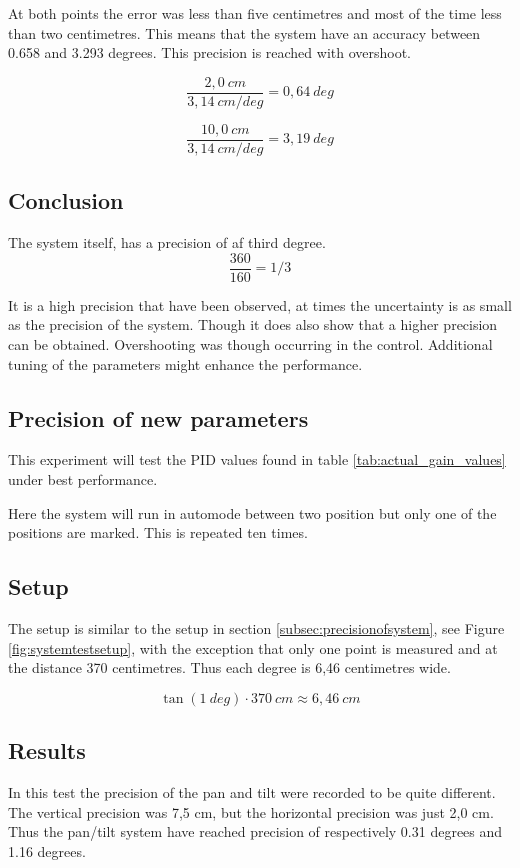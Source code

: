 At both points the error was less than five centimetres and most of the time
less than two centimetres. This means that the system have an accuracy between 0.658 and
3.293 degrees. This precision is reached with overshoot.

\[ \frac{2,0 \ cm}{3,14\ cm/deg} = 0,64 \ deg \]

\[ \frac{10,0 \ cm}{3,14 \ cm/deg} = 3,19 \ deg \]

\subsection*{Conclusion}

The system itself, has a precision of af third degree.
\[ \frac{360}{160} = 1/3 \]

It is a high precision that have been observed, at times the uncertainty is as
small as the precision of the system. Though it does also show that a higher
precision can be obtained. Overshooting was though occurring in the control.
Additional tuning of the parameters might enhance the performance.

\subsection{Precision of new parameters}\label{sec:precisionofsystem2}

This experiment will test the PID values found in table \ref{tab:actual_gain_values}
under best performance.

Here the system will run in automode between two position but only one of the
positions are marked. This is repeated ten times.

\subsection*{Setup}

The setup is similar to the setup in section \ref{subsec:precisionofsystem}, see
Figure \ref{fig:systemtestsetup}, with the exception that only one point is measured and at
the distance 370 centimetres. Thus each degree is 6,46 centimetres wide.

\[ \tan(1 \ deg) \cdot 370 \ cm \approx 6,46 \ cm \]

\subsection*{Results}

In this test the precision of the pan and tilt were recorded to be quite
different. The vertical precision was 7,5 cm, but the horizontal precision was just 2,0 cm. Thus the pan/tilt system have
reached precision of respectively 0.31 degrees and 1.16 degrees.


